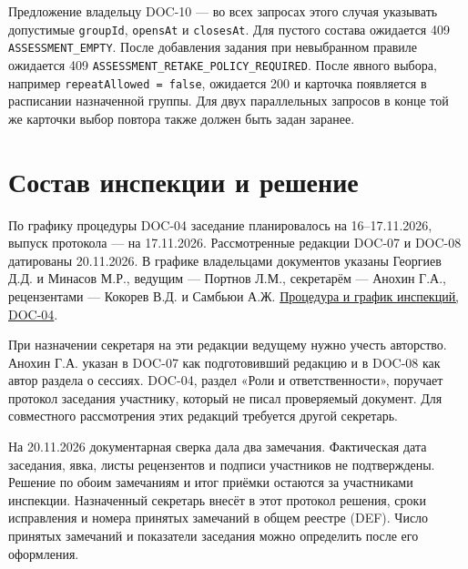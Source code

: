 \documentclass[12pt,a4paper]{article}
\begin{document}
Предложение владельцу DOC-10 --- во всех запросах этого случая указывать допустимые \texttt{groupId}, \texttt{opensAt} и \texttt{closesAt}. Для пустого состава ожидается 409 \texttt{ASSESSMENT\_\allowbreak{}EMPTY}. После добавления задания при невыбранном правиле ожидается 409 \texttt{ASSESSMENT\_\allowbreak{}RETAKE\_\allowbreak{}POLICY\_\allowbreak{}REQUIRED}. После явного выбора, например \texttt{repeat\allowbreak{}Allowed =\allowbreak{} false}, ожидается 200 и карточка появляется в расписании назначенной группы. Для двух параллельных запросов в конце той же карточки выбор повтора также должен быть задан заранее.

\section{Состав инспекции и решение}\label{ux441ux43eux441ux442ux430ux432-ux438ux43dux441ux43fux435ux43aux446ux438ux438-ux438-ux440ux435ux448ux435ux43dux438ux435}

\hypertarget{состав-инспекции-и-решение}{}

По графику процедуры DOC-04 заседание планировалось на 16--17.11.2026, выпуск протокола --- на 17.11.2026. Рассмотренные редакции DOC-07 и DOC-08 датированы 20.11.2026. В графике владельцами документов указаны Георгиев Д.Д. и Минасов М.Р., ведущим --- Портнов Л.М., секретарём --- Анохин Г.А., рецензентами --- Кокорев В.Д. и Самбьюи А.Ж. {\href{../06\_Процедура\_формальной\_инспекции/Процедура\_формальной\_инспекции.pdf}{Процедура и график инспекций, DOC-04}}.

При назначении секретаря на эти редакции ведущему нужно учесть авторство. Анохин Г.А. указан в DOC-07 как подготовивший редакцию и в DOC-08 как автор раздела о сессиях. DOC-04, раздел «Роли и ответственности», поручает протокол заседания участнику, который не писал проверяемый документ. Для совместного рассмотрения этих редакций требуется другой секретарь.

На 20.11.2026 документарная сверка дала два замечания. Фактическая дата заседания, явка, листы рецензентов и подписи участников не подтверждены. Решение по обоим замечаниям и итог приёмки остаются за участниками инспекции. Назначенный секретарь внесёт в этот протокол решения, сроки исправления и номера принятых замечаний в общем реестре (DEF). Число принятых замечаний и показатели заседания можно определить после его оформления.
\end{document}
